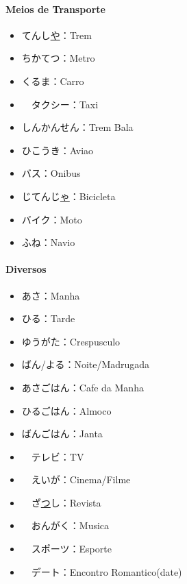 \documentclass[a4paper, 12pt]{article}
\begin{document}
\begin{CJK}{UTF8}{min}
\paragraph{Meios de Transporte}
	\begin{itemize}
		\item てんし\underline{や}：Trem
		\item ちかてつ：Metro
		\item くるま：Carro
		\item　タクシー：Taxi
		\item しんかんせん：Trem Bala
		\item ひこうき：Aviao
		\item バス：Onibus
		\item じてんじ\underline{ゃ}：Bicicleta
		\item バイク：Moto
		\item ふね：Navio
	\end{itemize}

\paragraph{Diversos}
	\begin{itemize}
		\item あさ：Manha
		\item ひる：Tarde
		\item ゆうがた：Crespusculo
		\item ばん/よる：Noite/Madrugada
		\item あさごはん：Cafe da Manha
		\item ひるごはん：Almoco
		\item ばんごはん：Janta
		\item　テレビ：TV
		\item　えいが：Cinema/Filme
		\item　ざ\underline{つ}し：Revista
		\item　おんがく：Musica
		\item　スポーツ：Esporte
		\item　デート：Encontro Romantico(date)
	\end{itemize}


\end{CJK}
\end{document}
